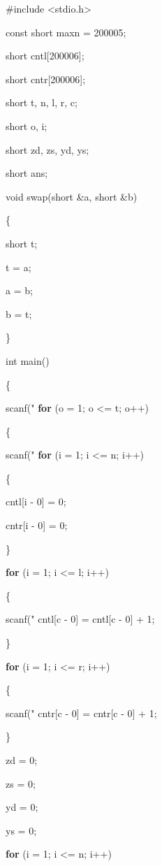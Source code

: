 \documentclass[]{ctexart}
\newenvironment{Shaded}{}{}
\newcommand{\AttributeTok}[1]{\textcolor[rgb]{0.49,0.56,0.16}{#1}}
\newcommand{\ControlFlowTok}[1]{\textcolor[rgb]{0.00,0.44,0.13}{\textbf{#1}}}
\newcommand{\DataTypeTok}[1]{\textcolor[rgb]{0.56,0.13,0.00}{#1}}
\newcommand{\DecValTok}[1]{\textcolor[rgb]{0.25,0.63,0.44}{#1}}
\newcommand{\ImportTok}[1]{#1}
\newcommand{\NormalTok}[1]{#1}
\newcommand{\PreprocessorTok}[1]{\textcolor[rgb]{0.74,0.48,0.00}{#1}}
\newcommand{\SpecialCharTok}[1]{\textcolor[rgb]{0.25,0.44,0.63}{#1}}
\newcommand{\StringTok}[1]{\textcolor[rgb]{0.25,0.44,0.63}{#1}}
\begin{document}
\begin{Shaded}
\begin{Highlighting}[]
\PreprocessorTok{#include }\ImportTok{<stdio.h>}\PreprocessorTok{
}


\AttributeTok{const} \DataTypeTok{short}\NormalTok{ maxn = }\DecValTok{200005}\NormalTok{;
}
\DataTypeTok{short}\NormalTok{ cntl[}\DecValTok{200006}\NormalTok{];
}
\DataTypeTok{short}\NormalTok{ cntr[}\DecValTok{200006}\NormalTok{];
}
\DataTypeTok{short}\NormalTok{ t, n, l, r, c;
}
\DataTypeTok{short}\NormalTok{ o, i;
}
\DataTypeTok{short}\NormalTok{ zd, zs, yd, ys;
}
\DataTypeTok{short}\NormalTok{ ans;
}
\DataTypeTok{void}\NormalTok{ swap(}\DataTypeTok{short}\NormalTok{ &a, }\DataTypeTok{short}\NormalTok{ &b)
}
\NormalTok{\{
}
    \DataTypeTok{short}\NormalTok{ t;
}
\NormalTok{    t = a;
}
\NormalTok{    a = b;
}
\NormalTok{    b = t;
}
\NormalTok{\}
}
\DataTypeTok{int}\NormalTok{ main()
}
\NormalTok{\{
}
\NormalTok{    scanf(}\StringTok{"}\SpecialCharTok{%hd}\StringTok{"}\NormalTok{, &t);
}
    \ControlFlowTok{for}\NormalTok{ (o = }\DecValTok{1}\NormalTok{; o <= t; o++)
}
\NormalTok{    \{
}
\NormalTok{        scanf(}\StringTok{"}\SpecialCharTok{%hd}\StringTok{ }\SpecialCharTok{%hd}\StringTok{ }\SpecialCharTok{%hd}\StringTok{"}\NormalTok{, &n, &l, &r);
}
        \ControlFlowTok{for}\NormalTok{ (i = }\DecValTok{1}\NormalTok{; i <= n; i++)
}
\NormalTok{        \{
}
\NormalTok{            cntl[i - }\DecValTok{0}\NormalTok{] = }\DecValTok{0}\NormalTok{;
}
\NormalTok{            cntr[i - }\DecValTok{0}\NormalTok{] = }\DecValTok{0}\NormalTok{;
}
\NormalTok{        \}
}
        \ControlFlowTok{for}\NormalTok{ (i = }\DecValTok{1}\NormalTok{; i <= l; i++)
}
\NormalTok{        \{
}
\NormalTok{            scanf(}\StringTok{"}\SpecialCharTok{%hd}\StringTok{"}\NormalTok{, &c);
}
\NormalTok{            cntl[c - }\DecValTok{0}\NormalTok{] = cntl[c - }\DecValTok{0}\NormalTok{] + }\DecValTok{1}\NormalTok{;
}
\NormalTok{        \}
}
        \ControlFlowTok{for}\NormalTok{ (i = }\DecValTok{1}\NormalTok{; i <= r; i++)
}
\NormalTok{        \{
}
\NormalTok{            scanf(}\StringTok{"}\SpecialCharTok{%hd}\StringTok{"}\NormalTok{, &c);
}
\NormalTok{            cntr[c - }\DecValTok{0}\NormalTok{] = cntr[c - }\DecValTok{0}\NormalTok{] + }\DecValTok{1}\NormalTok{;
}
\NormalTok{        \}
}
\NormalTok{        zd = }\DecValTok{0}\NormalTok{;
}
\NormalTok{        zs = }\DecValTok{0}\NormalTok{;
}
\NormalTok{        yd = }\DecValTok{0}\NormalTok{;
}
\NormalTok{        ys = }\DecValTok{0}\NormalTok{;
}
        \ControlFlowTok{for}\NormalTok{ (i = }\DecValTok{1}\NormalTok{; i <= n; i++)
}
\end{Highlighting}
\end{Shaded}
\end{document}
